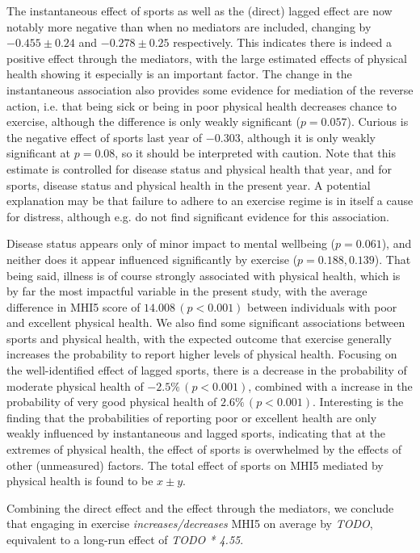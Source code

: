The instantaneous effect of sports as well as the (direct) lagged effect are now notably more negative than when no mediators
are included, changing by $-0.455 \pm 0.24$ and $-0.278 \pm 0.25$ respectively. This indicates there is indeed a
positive effect through the mediators, with the large estimated effects of physical health showing it especially is an important
factor. The change in the instantaneous association also provides some evidence for mediation of the reverse
action, i.e. that being sick or being in poor physical health decreases chance to exercise, although the difference
is only weakly significant ($p = 0.057$).
Curious is the negative effect of sports last year of $-0.303$, although it is only weakly significant at $p = 0.08$,
so it should be interpreted with caution. Note that this estimate is controlled for disease status and physical health
that year, and for sports, disease status and physical health in the present year. A potential explanation may be that
failure to adhere to an exercise regime is in itself a cause for distress, although e.g. 
do not find significant evidence for this association.

Disease status appears only of minor impact to mental wellbeing ($p = 0.061$),
and neither does it appear influenced significantly by exercise ($p = 0.188, 0.139$).
That being said, illness is of course strongly associated with physical health,
which is by far the most impactful variable in the present study, with the average difference in
MHI5 score of $14.008\,(p < 0.001)$ between individuals with poor and excellent physical health.
We also find some significant associations between sports and physical health, with the expected outcome that
exercise generally increases the probability to report higher levels of physical health.
Focusing on the well-identified effect of lagged sports, there is a decrease in the probability of moderate physical
health of $-2.5\%\,(p < 0.001)$, combined with a increase in the probability of very good physical health
of $2.6\%\,(p < 0.001)$. Interesting is the finding that the probabilities of reporting poor or excellent health
are only weakly influenced by instantaneous and lagged sports, indicating that at the extremes of physical health,
the effect of sports is overwhelmed by the effects of other (unmeasured) factors.
The total effect of sports on MHI5 mediated by physical health is found to be $x \pm y$. %

Combining the direct effect and the effect through the mediators, we conclude that engaging in exercise \textit{increases/decreases}
MHI5 on average by \textit{TODO}, equivalent to a long-run effect of \textit{TODO * 4.55}.

